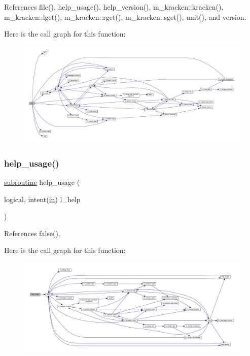 References file(), help\+\_\+usage(), help\+\_\+version(), m\+\_\+kracken\+::kracken(), m\+\_\+kracken\+::lget(), m\+\_\+kracken\+::rget(), m\+\_\+kracken\+::sget(), unit(), and version.

Here is the call graph for this function\+:
\nopagebreak
\begin{figure}[H]
\begin{center}
\leavevmode
\includegraphics[width=350pt]{fseq_8f90_af3934bd2dae2aeb0d214ae4aa8aeecb7_cgraph}
\end{center}
\end{figure}
\mbox{\label{fseq_8f90_a3e09a3b52ee8fb04eeb93fe5761626a8}} 
\subsubsection{\texorpdfstring{help\+\_\+usage()}{help\_usage()}}
{\footnotesize\ttfamily \hyperlink{M__stopwatch_83_8txt_acfbcff50169d691ff02d4a123ed70482}{subroutine} help\+\_\+usage (\begin{DoxyParamCaption}\item[{logical, intent(\hyperlink{M__journal_83_8txt_afce72651d1eed785a2132bee863b2f38}{in})}]{l\+\_\+help }\end{DoxyParamCaption})}



References false().

Here is the call graph for this function\+:
\nopagebreak
\begin{figure}[H]
\begin{center}
\leavevmode
\includegraphics[width=350pt]{fseq_8f90_a3e09a3b52ee8fb04eeb93fe5761626a8_cgraph}
\end{center}
\end{figure}
\mbox{\label{fseq_8f90_a39c21619b08a3c22f19e2306efd7f766}} 
